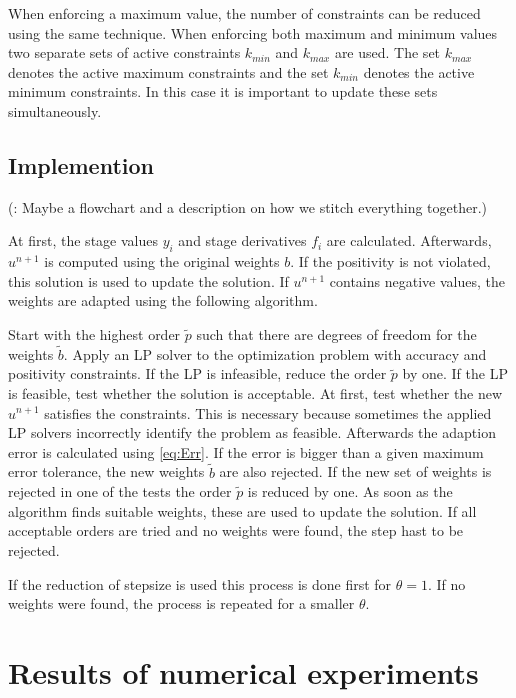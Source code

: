\documentclass[a4paper]{article}
\numberwithin{equation}{section}
\theoremstyle{plain}
\theoremstyle{definition}
\numberwithin{theorem}{section}
\newcommand{\1}{\mathbbm{1}}
\newcommand{\bt}{\tilde{b}}
\newcommand{\todo}[1]{{\Large{\color{red}{#1}}}}
\begin{document}
When enforcing a maximum value, the number of constraints can be reduced using the same technique. When enforcing both maximum and minimum values two separate sets of active constraints $k_{min}$ and $k_{max}$ are used. The set $k_{max}$ denotes the active maximum constraints and the set $k_{min}$ denotes the active minimum constraints.
In this case it is important to update these sets simultaneously.  

\subsection{Implemention}
(\todo{TODO}: Maybe a flowchart and a description on how we stitch everything together.) %

At first, the stage values $y_i$ and stage derivatives $f_i$ are calculated.
Afterwards, $u^{n+1}$ is computed using the original weights $b$.
If the positivity is not violated, this solution is used to update the solution.
If $u^{n+1}$ contains negative values, the weights are adapted using the following algorithm.

Start with the highest order $\tilde p$ such that there are degrees
of freedom for the weights $\bt$. Apply an LP solver to the optimization
problem with accuracy and positivity constraints.
If the LP is infeasible, reduce the order $\tilde p$ by one.
If the LP is feasible, test whether the solution is acceptable.
At first, test whether the new $u^{n+1}$ satisfies the constraints.
This is necessary because sometimes the applied LP solvers incorrectly
identify the problem as feasible.
Afterwards the adaption error is calculated using \eqref{eq:Err}.
If the error is bigger than a given maximum error tolerance, the
new weights $\bt$ are also rejected.
If the new set of weights is rejected in one of the tests the order
$\tilde p$ is reduced by one.
As soon as the algorithm finds suitable weights, these are used to update the solution.
If all acceptable orders are tried and no weights were found, the step hast to be rejected.

If the reduction of stepsize is used this process is done first for $\theta = 1$. If no weights were found, the process is repeated for a smaller $\theta$.



\section{Results of numerical experiments}\label{sec:Numeric_Results}
\end{document}
